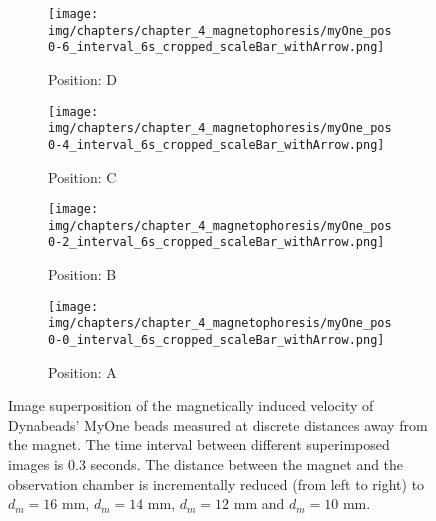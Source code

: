 \begin{figure}[htb]
	\centering
	\begin{subfigure}[b]{0.22\textwidth}
		\texttt{[image: img/chapters/chapter\_4\_magnetophoresis/myOne\_pos0-6\_interval\_6s\_cropped\_scaleBar\_withArrow.png]}
		\caption{Position: D}
	\end{subfigure}
	\hfill
	\begin{subfigure}[b]{0.22\textwidth}
		\texttt{[image: img/chapters/chapter\_4\_magnetophoresis/myOne\_pos0-4\_interval\_6s\_cropped\_scaleBar\_withArrow.png]}
		\caption{Position: C}
	\end{subfigure}
	\hfill
	\begin{subfigure}[b]{0.22\textwidth}
		\texttt{[image: img/chapters/chapter\_4\_magnetophoresis/myOne\_pos0-2\_interval\_6s\_cropped\_scaleBar\_withArrow.png]}
                \caption{Position: B}
	\end{subfigure}
	\hfill
	\begin{subfigure}[b]{0.22\textwidth}
		\texttt{[image: img/chapters/chapter\_4\_magnetophoresis/myOne\_pos0-0\_interval\_6s\_cropped\_scaleBar\_withArrow.png]}
		\caption{Position: A}
	\end{subfigure}      
	\caption[Magnetically induced velocities of Dynabeads' MyOne beads at different magnetophoretic driving forces]{Image superposition of the magnetically induced velocity of Dynabeads' MyOne beads measured at discrete distances away from the magnet. The time interval between different superimposed images is $0.3$ seconds. The distance between the magnet and the observation chamber is incrementally reduced (from left to right) to $d_{m}=16$ mm, $d_{m}=14$ mm, $d_{m}=12$ mm and $d_{m}=10$ mm.}
	\label{fig:particleMovement_myOne}
\end{figure} 

